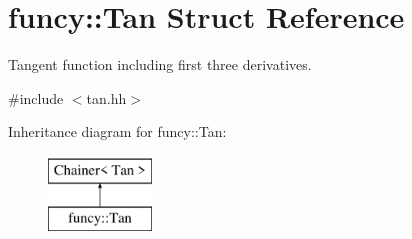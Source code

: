 \hypertarget{structfuncy_1_1Tan}{\section{funcy\-:\-:Tan Struct Reference}
\label{structfuncy_1_1Tan}
}


Tangent function including first three derivatives.  




{\ttfamily \#include $<$tan.\-hh$>$}

Inheritance diagram for funcy\-:\-:Tan\-:\begin{figure}[H]
\begin{center}
\leavevmode
\includegraphics[height=2.000000cm]{structfuncy_1_1Tan}
\end{center}
\end{figure}
